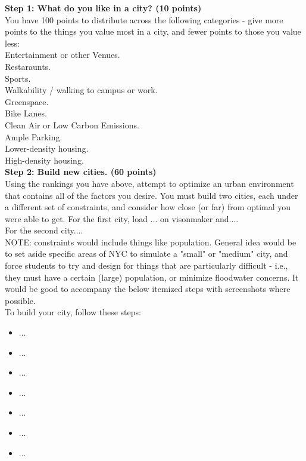 \documentclass{article}
\begin{document}
\vspace{3mm}
\textbf{Step 1: What do you like in a city? (10 points)}\\
You have 100 points to distribute across the following categories - give more points to the things you value most in a city, and fewer points to those you value less:\\
\underline{\hspace{0.35cm}} Entertainment or other Venues.\\
\underline{\hspace{0.35cm}} Restaraunts.\\
\underline{\hspace{0.35cm}} Sports. \\
\underline{\hspace{0.35cm}} Walkability / walking to campus or work. \\
\underline{\hspace{0.35cm}} Greenspace.\\
\underline{\hspace{0.35cm}} Bike Lanes.\\
\underline{\hspace{0.35cm}} Clean Air or Low Carbon Emissions.\\
\underline{\hspace{0.35cm}} Ample Parking.\\
\underline{\hspace{0.35cm}} Lower-density housing.\\
\underline{\hspace{0.35cm}} High-density housing.\\

\newpage
\textbf{Step 2: Build new cities. (60 points)}\\
Using the rankings you have above, attempt to optimize an urban environment that contains all of the factors you desire.  You must build two cities, each under a different set of constraints, and consider how close (or far) from optimal you were able to get.  For the first city, load ... on visonmaker and....\\
For the second city....\\
NOTE: constraints would include things like population.  General idea would be to set aside specific areas of NYC to simulate a "small" or "medium" city, and force students to try and design for things that are particularly difficult - i.e., they must have a certain (large) population, or minimize floodwater concerns.  It would be good to accompany the below itemized steps with screenshots where possible.\\
To build your city, follow these steps:
\begin{itemize}
\item ...
\item ...
\item ...
\item ...
\item ...
\item ...
\item ...
\end{itemize}
\vspace{3mm}
\end{document}
